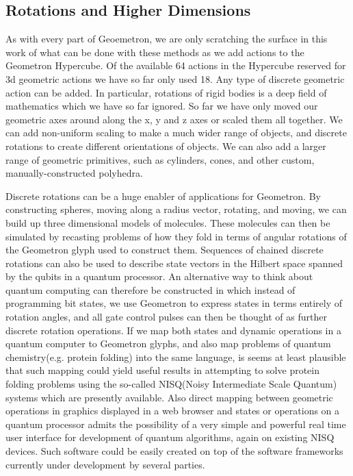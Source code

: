 \subsection{Rotations and Higher Dimensions}

As with every part of Geoemetron, we are only scratching the surface in this work of what can be done with these methods as we add actions to the Geometron Hypercube.  Of the available 64 actions in the Hypercube reserved for 3d geometric actions we have so far only used 18. Any type of discrete geometric action can be added.  In particular, rotations of rigid bodies is a deep field of mathematics which we have so far ignored.  So far we have only moved our geometric axes around along the x, y and z axes or scaled them all together.  We can add non-uniform scaling to make a much wider range of objects, and discrete rotations to create different orientations of objects.  We can also add a larger range of geometric primitives, such as cylinders, cones, and other custom, manually-constructed polyhedra.  

Discrete rotations can be a huge enabler of applications for Geometron.  By constructing spheres, moving along a radius vector, rotating, and moving, we can build up three dimensional models of molecules.  These molecules can then be simulated by recasting problems of how they fold in terms of angular rotations of the Geometron glyph used to construct them.  Sequences of chained discrete rotations can also be used to describe state vectors in the Hilbert space spanned by the qubits in a quantum processor.  An alternative way to think about quantum computing can therefore be constructed in which instead of programming bit states, we use Geometron to express states in terms entirely of rotation angles, and all gate control pulses can then be thought of as further discrete rotation operations.  If we map both states and dynamic operations in a quantum computer to Geometron glyphs, and also map problems of quantum chemistry(e.g. protein folding) into the same language, is seems at least plausible that such mapping could yield useful results in attempting to solve protein folding problems using the so-called NISQ(Noisy Intermediate Scale Quantum) systems which are presently available.  Also direct mapping between geometric operations in graphics displayed in a web browser and states or operations on a quantum processor admits the possibility of a very simple and powerful real time user interface for development of quantum algorithms, again on existing NISQ devices.  Such software could be easily created on top of the software frameworks currently under development by several parties. 

